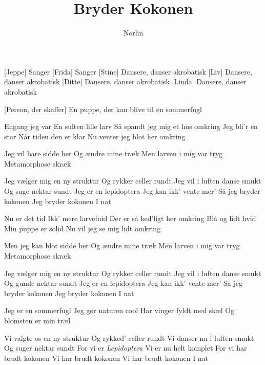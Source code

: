 \documentclass[a4paper,11pt]{article}
\title{Bryder Kokonen}
\author{Norlin}
\begin{document}
\maketitle

\begin{roles}
    [Jeppe] Sanger
    [Frida] Sanger
    [Stine] Dansere, danser akrobatisk
    [Liv] Dansere, danser akrobatisk
    [Ditte] Dansere, danser akrobatisk
    [Linda] Dansere, danser akrobatisk
\end{roles}

\begin{props}
    [Person, der skaffer] En puppe, der kan blive til en sommerfugl
\end{props}

\begin{song}

Engang jeg var
En sulten lille larv
Så spandt jeg mig et hus omkring
Jeg bli’r en star
Når tiden den er klar
Nu venter jeg blot her omkring
 
Jeg vil bare sidde her
Og ændre mine træk
Men larven i mig var tryg
Metamorphose skræk
 
Jeg vælger mig en ny struktur
Og rykker celler rundt
Jeg vil i luften danse smukt
Og suge nektar sundt
Jeg er en lepidoptera
Jeg kan ikk’ vente mer’
Så jeg bryder kokonen
Jeg bryder kokonen
I nat
 
Nu er det tid
Ikk’ mere larvefnid
Der er så ked’ligt her omkring
Blå og lidt hvid
Min puppe er solid
Nu vil jeg se mig lidt omkring
 
Men jeg kan blot sidde her
Og ændre mine træk
Men larven i mig var tryg
Metamorphose skræk
 
Jeg vælger mig en ny struktur
Og rykker celler rundt
Jeg vil i luften danse smukt
Og gumle nektar sundt
Jeg er en lepidoptera
Jeg kan ikk’ vente mer’
Så jeg bryder kokonen
Jeg bryder kokonen
I nat
 
Jeg er en sommerfugl
Jeg gør naturen cool
Har vinger fyldt med skæl
Og blomsten er min træl
 
Vi valgte os en ny struktur
Og rykked’ celler rundt
Vi danser nu i luften smukt
Og suger nektar sundt
For vi er \textit{Lepidoptera}
Vi er nu helt komplet
For vi har brudt kokonen
Vi har brudt kokonen
Vi har brudt kokonen
I nat

\end{song}
\end{document}
